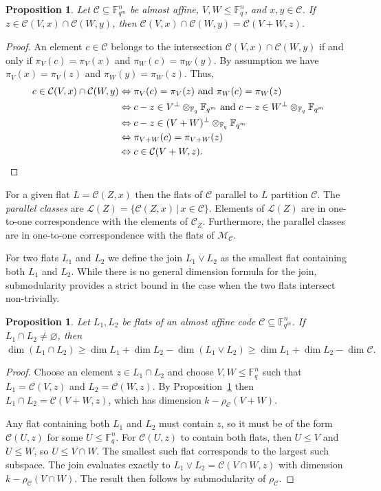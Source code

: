 \documentclass[a4paper,11pt,reqno]{article}
\newcommand{\F}{\mathbb{F}}
\newcommand{\M}{\mathcal{M}}
\newcommand{\C}{\mathcal{C}}
\theoremstyle{plain} \numberwithin{equation}{section}
\newtheorem{proposition}[theorem]{Proposition}
\theoremstyle{definition}
\begin{document}
\begin{proposition} \label{prop:intersectflats}
Let $\C\subseteq \F_{q^m}^n$ be almost affine, $V,W\leq \F_q^n$, and $x,y\in \C$. If $z\in \C(V,x)\cap \C(W,y)$, then $\C(V,x)\cap \C(W,y) = \C(V+W,z)$.
\end{proposition}
\begin{proof}
An element $c\in \C$ belongs to the intersection $\C(V,x)\cap \C(W,y)$ if and only if $\pi_V(c) = \pi_V(x)$ and $\pi_W(c)= \pi_W(y)$. By assumption we have $\pi_V(x) = \pi_V(z)$ and $\pi_W(y)=\pi_W(z)$. Thus, 
\begin{align*}
    c\in \C(V,x)\cap \C(W,y) &\Leftrightarrow \pi_V(c) = \pi_V(z) \text{ and } \pi_W(c)=\pi_W(z) \\
    &\Leftrightarrow c-z\in V^\perp \otimes_{\F_q}\F_{q^m} \text{ and } c-z\in W^\perp \otimes_{\F_q}\F_{q^m} \\
    &\Leftrightarrow c-z\in (V+W)^\perp \otimes_{\F_q}\F_{q^m} \\
    & \Leftrightarrow \pi_{V+W}(c)=\pi_{V+W}(z) \\
    & \Leftrightarrow c\in \C(V+W,z). \qedhere
\end{align*}
\end{proof}

For a given flat $L = \C(Z,x)$ then the flats of $\C$ parallel to $L$ partition $\C$. The \emph{parallel classes} are $\mathcal{L}(Z) = \{ \C(Z,x) \, |\, x\in \C\}$. Elements of $\mathcal{L}(Z)$ are in one-to-one correspondence with the elements of $\C_Z$. Furthermore, the parallel classes are in one-to-one correspondence with the flats of $\M_\C$. 

For two flats $L_1$ and $L_2$ we define the join $L_1 \vee L_2$ as the smallest flat containing both $L_1$ and $L_2$. While there is no general dimension formula for the join, submodularity provides a strict bound in the case when the two flats intersect non-trivially.

\begin{proposition}
    Let $L_1,L_2$ be flats of an almost affine code $\C\subseteq\F_{q^m}^n$. If $L_1 \cap L_2 \neq \varnothing$, then $
        \dim( L_1 \cap L_2) \geq \dim L_1 + \dim L_2 - \dim (L_1 \vee L_2) \geq \dim L_1 + \dim L_2 - \dim \C.$
\end{proposition}
\begin{proof}
Choose an element $z\in L_1 \cap L_2$ and choose $V,W\leq \F_q^n$ such that $L_1 = \C(V,z)$ and $L_2=\C(W,z)$. By Proposition~\ref{prop:intersectflats} then $L_1 \cap L_2 = \C(V+W,z)$, which has dimension $k-\rho_\C(V+W)$. 

Any flat containing both $L_1$ and $L_2$ must contain $z$, so it must be of the form $\C(U,z)$ for some $U\leq \F_q^n$. For $\C(U,z)$ to contain both flats, then $U\leq V$ and $U\leq W$, so $U\leq V\cap W$. The smallest such flat corresponds to the largest such subspace. The join evaluates exactly to $L_1 \vee L_2 = \C(V\cap W,z)$ with dimension $k-\rho_\C(V\cap W)$. The result then follows by submodularity of $\rho_\C$.
\end{proof}
\end{document}
